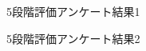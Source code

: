 \documentclass[syuuron]{kuee}
\begin{document}
		\begin{figure}
			\begin{center}
			\end{center}
			\caption{5段階評価アンケート結果1}
	  		\label{fig:res7}
		\end{figure}
		\begin{figure}
			\begin{center}
			\end{center}
			\caption{5段階評価アンケート結果2}
	  		\label{fig:res8}
		\end{figure}
\end{document}
